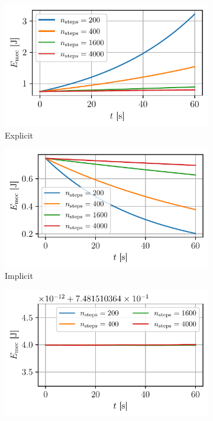 \begin{figure}[h]
    \centering
    \begin{subfigure}{0.5\linewidth}
        \centering
        \includegraphics[width=\linewidth]{figures/nograv_energy_explicit.pdf}
        \caption{Explicit}
    \end{subfigure}%
    \begin{subfigure}{0.5\linewidth}
        \centering
        \includegraphics[width=\linewidth]{figures/nograv_energy_implicit.pdf}
        \caption{Implicit}
    \end{subfigure}
    \begin{subfigure}{0.5\linewidth}
        \centering
        \includegraphics[width=\linewidth]{figures/nograv_energy_semiimplicit.pdf}

\end{subfigure}
\end{figure}
